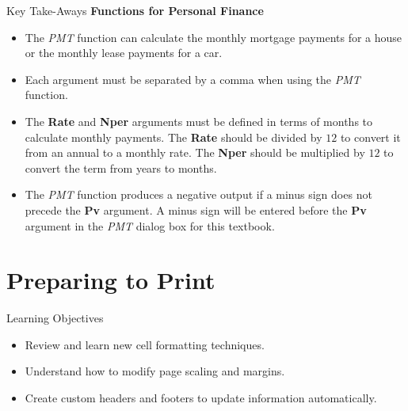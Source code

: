 \begin{center}
	\begin{tkwbox}{Key Take-Aways}
		\textbf{Functions for Personal Finance}
		\\
		\begin{itemize}
			\setlength{\itemsep}{0pt}
			\setlength{\parskip}{0pt}
			\setlength{\parsep}{0pt}
			
			\item The \textit{PMT} function can calculate the monthly mortgage payments for a house or the monthly lease payments for a car.
			\item Each argument must be separated by a comma when using the \textit{PMT} function.
			\item The \textbf{Rate} and \textbf{Nper} arguments must be defined in terms of months to calculate monthly payments. The \textbf{Rate} should be divided by $ 12 $ to convert it from an annual to a monthly rate. The \textbf{Nper} should be multiplied by $ 12 $ to convert the term from years to months.
			\item The \textit{PMT} function produces a negative output if a minus sign does not precede the \textbf{Pv} argument. A minus sign will be entered before the \textbf{Pv} argument in the \textit{PMT} dialog box for this textbook.
			
		\end{itemize}
	\end{tkwbox}
\end{center}

\section{Preparing to Print}\label{ch02:preparing_to_print}

\begin{center}
	\begin{objbox}{Learning Objectives}
		\begin{itemize}
			\setlength{\itemsep}{0pt}
			\setlength{\parskip}{0pt}
			\setlength{\parsep}{0pt}
			
			\item Review and learn new cell formatting techniques.
			\item Understand how to modify page scaling and margins.
			\item Create custom headers and footers to update information automatically.

		\end{itemize}
	\end{objbox}
\end{center}

